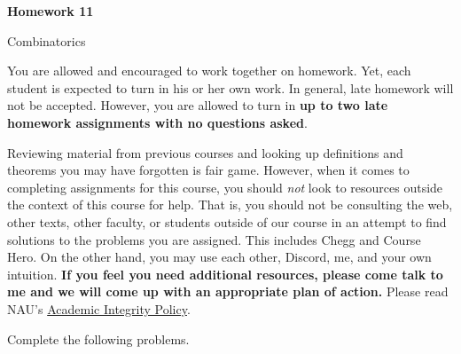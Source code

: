 \documentclass[11pt]{article}%
\theoremstyle{definition}
\newcommand{\blankline}{\pagebreak[2]\vspace{.5\baselineskip}}
\begin{document}
\begin{center}
{\Large\bf Homework 11}

\smallskip

Combinatorics
\end{center}

\thispagestyle{fancy}

You are allowed and encouraged to work together on homework. Yet, each student is expected to turn in his or her own work. In general, late homework will not be accepted. However, you are allowed to turn in \textbf{up to two late homework assignments with no questions asked}. 

\blankline

Reviewing material from previous courses and looking up definitions and theorems you may have forgotten is fair game. However, when it comes to completing assignments for this course, you should \emph{not} look to resources outside the context of this course for help.  That is, you should not be consulting the web, other texts, other faculty, or students outside of our course in an attempt to find solutions to the problems you are assigned.  This includes Chegg and Course Hero. On the other hand, you may use each other, Discord, me, and your own intuition. \textbf{If you feel you need additional resources, please come talk to me and we will come up with an appropriate plan of action.} Please read NAU's \href{https://www5.nau.edu/policies/Client/Details/828?whoIsLooking=Students&pertainsTo=All&sortDirection=Ascending&page=1}{Academic Integrity Policy}.

\blankline

Complete the following problems. 
\end{document}
